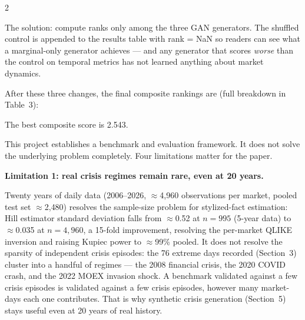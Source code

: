 \documentclass[10pt]{article}
\newcommand{\purplebox}[2]{\begin{tcolorbox}[mybox={Purple}{LBg},title={#1}]#2\end{tcolorbox}}
\begin{document}
\begin{multicols}{2}
{The solution: compute ranks only among the three GAN generators. The shuffled control is appended to the results table with rank = NaN so readers can see what a marginal-only generator achieves --- and any generator that scores \emph{worse} than the control on temporal metrics has not learned anything about market dynamics.

\medskip
After these three changes, the final composite rankings are (full breakdown in
Table~3):


\smallskip
The best composite score is 2.543.}

\columnbreak

\purplebox{9\quad What We Still Cannot Do}{%
This project establishes a benchmark and evaluation framework. It does not solve the underlying problem completely. Four limitations matter for the paper.

\medskip
\textbf{Limitation 1: real crisis regimes remain rare, even at 20 years.}

Twenty years of daily data (2006--2026, $\approx$4{,}960 observations per market, pooled test set $\approx$2{,}480) resolves the sample-size problem for stylized-fact estimation: Hill estimator standard deviation falls from $\approx$0.52 at $n=995$ (5-year data) to $\approx$0.035 at $n=4{,}960$, a 15-fold improvement, resolving the per-market QLIKE inversion and raising Kupiec power to $\approx$99\% pooled. It does not resolve the sparsity of independent crisis episodes: the 76 extreme days recorded (Section~3) cluster into a handful of regimes --- the 2008 financial crisis, the 2020 COVID crash, and the 2022 MOEX invasion shock. A benchmark validated against a few crisis episodes is validated against a few crisis episodes, however many market-days each one contributes. That is why synthetic crisis generation (Section~5) stays useful even at 20 years of real history.

}
\end{multicols}
\end{document}
